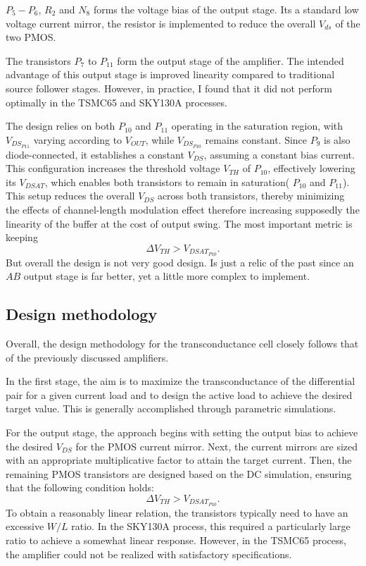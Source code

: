 \documentclass[12pt]{article}
\begin{document}
$P_5 - P_6$, $R_2$ and $N_8$ forms the voltage bias of the output stage. Its a standard low voltage current mirror, the resistor is implemented to reduce the overall $V_{ds}$ of the two PMOS.

The transistors $P_7$ to $P_{11}$ form the output stage of the amplifier. The intended advantage of this output stage is improved linearity compared to traditional source follower stages. However, in practice, I found that it did not perform optimally in the \ac{TSMC65} and \ac{SKY130A} processes.

The design relies on both $P_{10}$ and $P_{11}$ operating in the saturation region, with $V_{DS_{P11}}$ varying according to $V_{OUT}$, while $V_{DS_{P10}}$ remains constant. Since $P_9$ is also diode-connected, it establishes a constant $V_{DS}$, assuming a constant bias current. This configuration increases the threshold voltage $V_{TH}$ of $P_{10}$, effectively lowering its $V_{DSAT}$, which enables both transistors to remain in saturation( $P_{10}$ and $P_{11}$). This setup reduces the overall $V_{DS}$ across both transistors, thereby minimizing the effects of channel-length modulation effect therefore increasing supposedly the linearity of the buffer at the cost of output swing.
The most important metric is keeping
\begin{equation}
    \Delta V_{TH} > V_{DSAT_{P10}}.
\end{equation}
But overall the design is not very good design. Is just  a relic of the past since an $AB$ output stage is far better, yet a little more complex to implement.


\subsection{Design methodology}
Overall, the design methodology for the transconductance cell closely follows that of the previously discussed amplifiers.

In the first stage, the aim is to maximize the transconductance of the differential pair for a given current load and to design the active load to achieve the desired target value. This is generally accomplished through parametric simulations.

For the output stage, the approach begins with setting the output bias to achieve the desired $V_{DS}$ for the PMOS current mirror. Next, the current mirrors are sized with an appropriate multiplicative factor to attain the target current. Then, the remaining PMOS transistors are designed based on the DC simulation, ensuring that the following condition holds:
\begin{equation}
    \Delta V_{TH} > V_{DSAT_{P10}}.
\end{equation}
To obtain a reasonably linear relation, the transistors typically need to have an excessive \( W/L \) ratio. In the \ac{SKY130A} process, this required a particularly large ratio to achieve a somewhat linear response. However, in the \ac{TSMC65} process, the amplifier could not be realized with satisfactory specifications.
\end{document}
